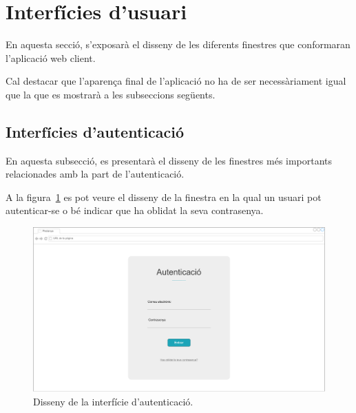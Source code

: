 \documentclass[a4paper,12pt]{ThesisStyle}
\begin{document}
\section{Interfícies d'usuari}
\label{sec:interficies_usuari}

En aquesta secció, s'exposarà el disseny de les diferents finestres que conformaran l'aplicació web client.

Cal destacar que l'aparença final de l'aplicació no ha de ser necessàriament igual que la que es mostrarà a les subseccions següents.

\subsection{Interfícies d'autenticació}
\label{subsec:interficies_auth}

En aquesta subsecció, es presentarà el disseny de les finestres més importants relacionades amb la part de l'autenticació.

A la figura~\ref{img:login} es pot veure el disseny de la finestra en la qual un usuari pot autenticar-se o bé indicar que ha oblidat la seva contrasenya.
\begin{figure}[H]
	\centering
	\includegraphics[width=\textwidth]{assets/interfaces/auth/login.pdf}
	\caption{\label{img:login}Disseny de la interfície d'autenticació.}
\end{figure}
\end{document}
